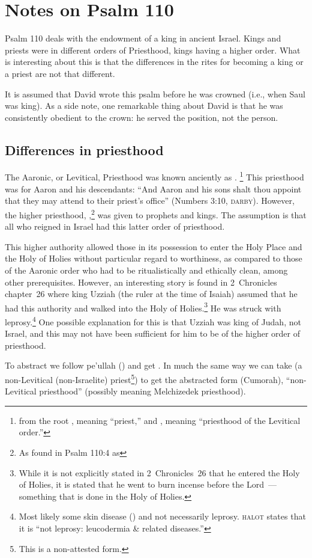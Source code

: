 \section{Notes on Psalm 110}\label{app:psalm-110}
Psalm 110 deals with the endowment of a king in ancient Israel. Kings and priests were in different orders of Priesthood, kings having a higher order. What is interesting about this is that the differences in the rites for becoming a king or a priest are not that different.

It is assumed that David wrote this psalm before he was crowned (i.e., when Saul was king). As a side note, one remarkable thing about David is that he was consistently obedient to the crown: he served the position, not the person.

\subsection{Differences in priesthood}
The Aaronic, or Levitical, Priesthood was known anciently as .%
\footnote{from the root , meaning ``priest,'' and , meaning ``priesthood of the Levitical order.''}
This priesthood was for Aaron and his descendants: ``And Aaron and his sons shalt thou appoint that they may attend to their priest's office'' (Numbers 3:10, \textsc{darby}). However, the higher priesthood, ,\footnote{As found in Psalm 110:4 as } was given to prophets and kings. The assumption is that all who reigned in Israel had this latter order of priesthood.

This higher authority allowed those in its possession to enter the Holy Place and the Holy of Holies without particular regard to worthiness, as compared to those of the Aaronic order who had to be ritualistically and ethically clean, among other prerequisites. However, an interesting story is found in 2~Chronicles chapter~26 where king Uzziah (the ruler at the time of Isaiah) assumed that he had this authority and walked into the Holy of Holies.\footnote{While it is not explicitly stated in 2~Chronicles~26 that he entered the Holy of Holies, it is stated that he went to burn incense before the Lord~--- something that is done in the Holy of Holies.} He was struck with leprosy.\footnote{Most likely some skin disease () and not necessarily leprosy. \textsc{halot} states that it is ``not leprosy: leucodermia \& related diseases.''} One possible explanation for this is that Uzziah was king of Judah, not Israel, and this may not have been sufficient for him to be of the higher order of priesthood.

To abstract  we follow pe'ullah () and get . In much the same way we can take  (a non-Levitical (non-Israelite) priest\footnote{This is a non-attested form.}) to get the abstracted form  (Cumorah), ``non-Levitical priesthood'' (possibly meaning Melchizedek priesthood).
